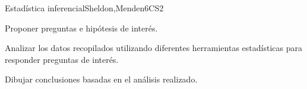 \begin{syllabus}
\begin{unit}{Estadística inferencial}{}{Sheldon,Menden}{6}{CS2}
   \begin{learningoutcomes}
      \item Proponer preguntas e hipótesis de interés.
      \item Analizar los datos recopilados utilizando diferentes herramientas estadísticas para responder preguntas de interés.
      \item Dibujar conclusiones basadas en el análisis realizado.
   \end{learningoutcomes}
\end{unit}





\begin{coursebibliography}
\end{coursebibliography}

\end{syllabus}
